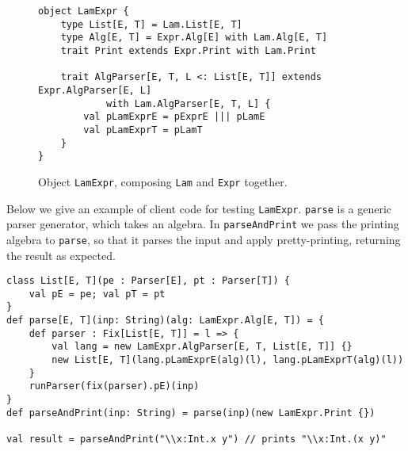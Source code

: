 \begin{figure}[htbp]
\centering
\begin{lstlisting}
object LamExpr {
    type List[E, T] = Lam.List[E, T]
    type Alg[E, T] = Expr.Alg[E] with Lam.Alg[E, T]
    trait Print extends Expr.Print with Lam.Print

    trait AlgParser[E, T, L <: List[E, T]] extends Expr.AlgParser[E, L]
            with Lam.AlgParser[E, T, L] {
        val pLamExprE = pExprE ||| pLamE
        val pLamExprT = pLamT
    }
}
\end{lstlisting}
\caption{Object \lstinline{LamExpr}, composing \lstinline{Lam} and \lstinline{Expr} together.}\label{fig:objectlamexpr}
\end{figure}

Below we give an example of client code for testing \lstinline{LamExpr}. \lstinline{parse} is a generic parser generator, which takes an algebra.
In \lstinline{parseAndPrint} we pass the printing algebra to \lstinline{parse}, so that it parses the input and apply pretty-printing, returning the result as expected.

\begin{lstlisting}
class List[E, T](pe : Parser[E], pt : Parser[T]) {
    val pE = pe; val pT = pt
}
def parse[E, T](inp: String)(alg: LamExpr.Alg[E, T]) = {
    def parser : Fix[List[E, T]] = l => {
        val lang = new LamExpr.AlgParser[E, T, List[E, T]] {}
        new List[E, T](lang.pLamExprE(alg)(l), lang.pLamExprT(alg)(l))
    }
    runParser(fix(parser).pE)(inp)
}
def parseAndPrint(inp: String) = parse(inp)(new LamExpr.Print {})

val result = parseAndPrint("\\x:Int.x y") // prints "\\x:Int.(x y)"
\end{lstlisting}
